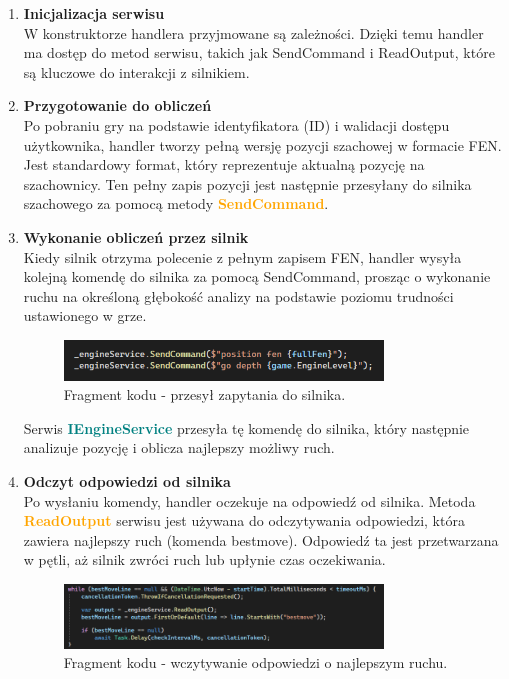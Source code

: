 \documentclass[12pt,a4paper]{article}
\begin{document}
\begin{enumerate}
    \item \textbf{Inicjalizacja serwisu}\\
    W konstruktorze handlera przyjmowane są zależności. Dzięki temu handler ma dostęp do metod serwisu, takich jak SendCommand i ReadOutput, które są kluczowe do interakcji z silnikiem.

    \item \textbf{Przygotowanie do obliczeń}\\
    Po pobraniu gry na podstawie identyfikatora (ID) i walidacji dostępu użytkownika, handler tworzy pełną wersję pozycji szachowej w formacie FEN. Jest standardowy format, który reprezentuje aktualną pozycję na szachownicy. Ten pełny zapis pozycji jest następnie przesyłany do silnika szachowego za pomocą metody \textcolor{orange}{\textbf{SendCommand}}.

    \item \textbf{Wykonanie obliczeń przez silnik}\\
    Kiedy silnik otrzyma polecenie z pełnym zapisem FEN, handler wysyła kolejną komendę do silnika za pomocą SendCommand, prosząc o wykonanie ruchu na określoną głębokość analizy na podstawie poziomu trudności ustawionego w grze.

    \begin{figure}[h!]
        \centering
        \includegraphics[width=0.8\textwidth]{images/ex_send_command.png}
        \caption{Fragment kodu - przesył zapytania do silnika.}
    \end{figure}

    Serwis \textcolor{teal}{\textbf{IEngineService}} przesyła tę komendę do silnika, który następnie analizuje pozycję i oblicza najlepszy możliwy ruch.

    \item \textbf{Odczyt odpowiedzi od silnika}\\
    Po wysłaniu komendy, handler oczekuje na odpowiedź od silnika. Metoda \textcolor{orange}{\textbf{ReadOutput}} serwisu jest używana do odczytywania odpowiedzi, która zawiera najlepszy ruch (komenda bestmove). Odpowiedź ta jest przetwarzana w pętli, aż silnik zwróci ruch lub upłynie czas oczekiwania.
    
    \begin{figure}[h!]
        \centering
        \includegraphics[width=0.8\textwidth]{images/ex_read_output.png}
        \caption{Fragment kodu - wczytywanie odpowiedzi o najlepszym ruchu.}
    \end{figure}


\end{enumerate}
\end{document}
